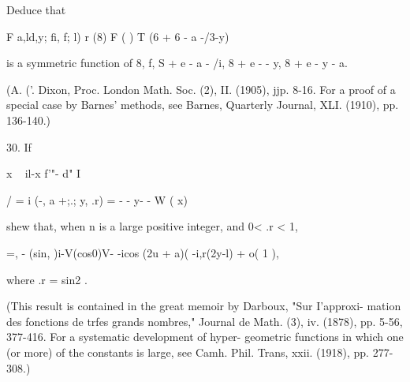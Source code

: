 Deduce that

F a,ld,y; fi, f; l) r (8) F ( ) T (6 + 6 - a -/3-y)

is a symmetric function of 8, f, S + e - a - /i, 8 + e - - y, 8 + e -
y - a.

(A. ('. Dixon, Proc. London Math. Soc. (2), II. (1905), jjp. 8-16. For
a proof of a special case by Barnes' methods, see Barnes, Quarterly
Journal, XLI. (1910), pp. 136-140.)

30. If

x ~ il-x f'"- d" I

/ = i (-, a +;.; y, .r) = - - y- - W ( x) \

shew that, when n is a large positive integer, and 0< .r < 1,

  =, - (sin, )i-V(cos0)V- -icos (2u + a)( -i,r(2y-l) + o( 1 ),

where .r = sin2 .

(This result is contained in the great memoir by Darboux, "Sur
I'approxi- mation des fonctions de trfes grands nombres," Journal de
Math. (3), iv. (1878), pp. 5-56, 377-416. For a systematic development
of hyper- geometric functions in which one (or more) of the constants
is large, see Camh. Phil. Trans, xxii. (1918), pp. 277-308.)

